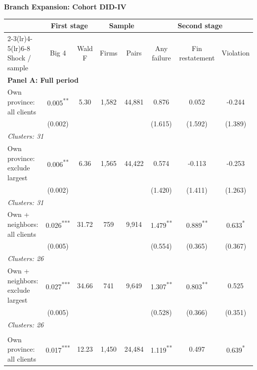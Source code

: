 \documentclass[10pt]{article}
\newcommand{\sym}[1]{\textsuperscript{#1}}
\begin{document}
\begin{minipage}{23.60cm}
\fontsize{10}{12}\selectfont
\setlength{\tabcolsep}{4pt}\renewcommand{\arraystretch}{1.08}
{\large\bfseries Branch Expansion: Cohort DID-IV}\par\medskip
\begin{tabular*}{\linewidth}{@{\extracolsep{\fill}}lccccccc@{}}
\toprule
 & \multicolumn{2}{c}{First stage} & \multicolumn{2}{c}{Sample} & \multicolumn{3}{c}{Second stage} \\
\cmidrule(lr){2-3}\cmidrule(lr){4-5}\cmidrule(lr){6-8}
Shock / sample & Big 4 & Wald F & Firms & Pairs & Any failure & Fin restatement & Violation \\
\midrule
\multicolumn{8}{l}{\textbf{Panel A: Full period}} \\
\addlinespace[3pt]
Own province: all clients & 0.005\sym{**} & 5.30 & 1,582 & 44,881 & 0.876 & 0.052 & -0.244 \\
 & (0.002) &  &  &  & (1.615) & (1.592) & (1.389) \\
\multicolumn{8}{l}{\hspace{1em}\textit{Clusters: 31}} \\
\addlinespace[3pt]
Own province: exclude largest & 0.006\sym{**} & 6.36 & 1,565 & 44,422 & 0.574 & -0.113 & -0.253 \\
 & (0.002) &  &  &  & (1.420) & (1.411) & (1.263) \\
\multicolumn{8}{l}{\hspace{1em}\textit{Clusters: 31}} \\
\addlinespace[3pt]
Own + neighbors: all clients & 0.026\sym{***} & 31.72 & 759 & 9,914 & 1.479\sym{**} & 0.889\sym{**} & 0.633\sym{*} \\
 & (0.005) &  &  &  & (0.554) & (0.365) & (0.367) \\
\multicolumn{8}{l}{\hspace{1em}\textit{Clusters: 26}} \\
\addlinespace[3pt]
Own + neighbors: exclude largest & 0.027\sym{***} & 34.66 & 741 & 9,649 & 1.307\sym{**} & 0.803\sym{**} & 0.525 \\
 & (0.005) &  &  &  & (0.528) & (0.366) & (0.351) \\
\multicolumn{8}{l}{\hspace{1em}\textit{Clusters: 26}} \\
\addlinespace[3pt]
\midrule
\multicolumn{8}{l}{\textbf{Panel B: Through 2012}} \\
\addlinespace[3pt]
Own province: all clients & 0.017\sym{***} & 12.23 & 1,450 & 24,484 & 1.119\sym{**} & 0.497 & 0.639\sym{*} \\

\end{tabular*}
\end{minipage}
\end{document}
